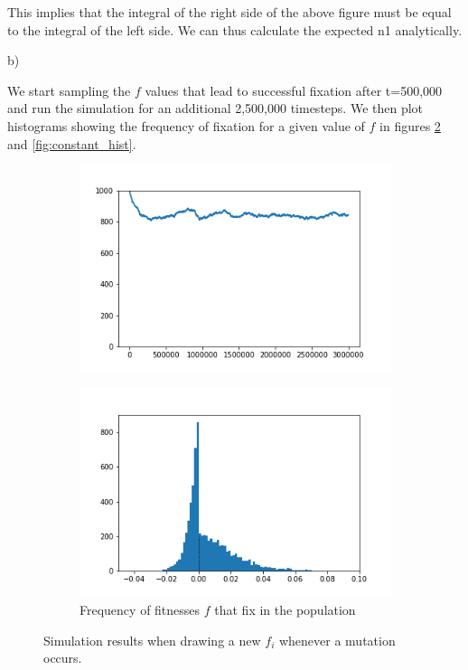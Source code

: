 \documentclass{article}
\begin{document}
This implies that the integral of the right side of the above figure must be equal to the integral of the left side. We can thus calculate the expected n1 analytically.

b)

We start sampling the $f$ values that lead to successful fixation after t=500,000 and run the simulation for an additional 2,500,000 timesteps. We then plot histograms showing the frequency of fixation for a given value of $f$ in figures \ref{fig:resample_hist} and \ref{fig:constant_hist}.

\begin{figure}[h]
	\centering
	\begin{subfigure}[t]{0.43\linewidth}
		\centering
		\includegraphics[width = 1.0\linewidth, trim={0 0 0 0}, clip=true]{figures/resample_selection_trajec.png}
		\label{fig:resample_trajec}	
	\end{subfigure}
	\hspace{0.1\linewidth}
	\begin{subfigure}[t]{0.43\linewidth}
		\centering
		\includegraphics[width = 1.0\linewidth, trim={0 0 0 0}, clip=true]{figures/resample_selection_hist2.png}
		\caption{Frequency of fitnesses $f$ that fix in the population}
		\label{fig:resample_hist}
	\end{subfigure}
\caption{Simulation results when drawing a new $f_i$ whenever a mutation occurs.}
\label{fig:resample}
\end{figure}
\end{document}
